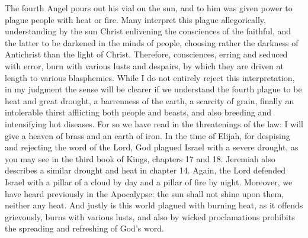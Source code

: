 The fourth Angel pours out his vial on the sun, and to him was given power to plague people with heat or fire. Many interpret this plague allegorically, understanding by the sun Christ enlivening the consciences of the faithful, and the latter to be darkened in the minds of people, choosing rather the darkness of Antichrist than the light of Christ. Therefore, consciences, erring and seduced with error, burn with various lusts and despairs, by which they are driven at length to various blasphemies. While I do not entirely reject this interpretation, in my judgment the sense will be clearer if we understand the fourth plague to be heat and great drought, a barrenness of the earth, a scarcity of grain, finally an intolerable thirst afflicting both people and beasts, and also breeding and intensifying hot diseases. For so we have read in the threatenings of the law: I will give a heaven of brass and an earth of iron. In the time of Elijah, for despising and rejecting the word of the Lord, God plagued Israel with a severe drought, as you may see in the third book of Kings, chapters 17 and 18. Jeremiah also describes a similar drought and heat in chapter 14. Again, the Lord defended Israel with a pillar of a cloud by day and a pillar of fire by night. Moreover, we have heard previously in the Apocalypse: the sun shall not shine upon them, neither any heat. And justly is this world plagued with burning heat, as it offends grievously, burns with various lusts, and also by wicked proclamations prohibits the spreading and refreshing of God’s word.

